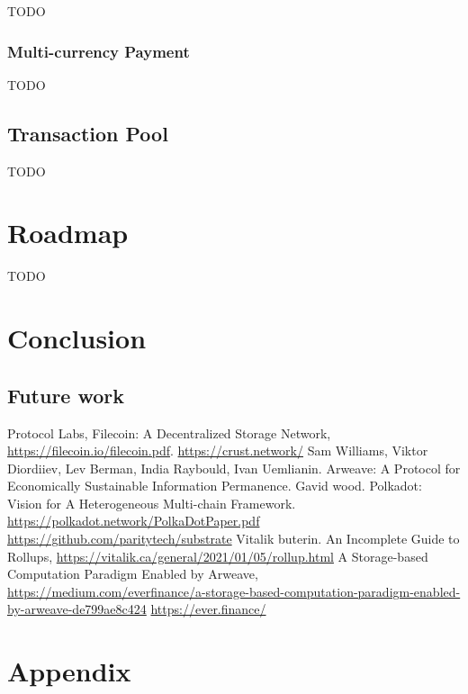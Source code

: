 \documentclass[]{article}
\begin{document}
TODO

\subsubsection{Multi-currency Payment}

TODO

\subsection{Transaction Pool}

TODO

\section{Roadmap}

TODO

\section{Conclusion}

\subsection{Future work}

\begin{thebibliography}{99}
Protocol Labs, Filecoin: A Decentralized Storage Network, \url{https://filecoin.io/filecoin.pdf}.
\url{https://crust.network/}
Sam Williams, Viktor Diordiiev, Lev Berman, India Raybould, Ivan Uemlianin. Arweave: A Protocol for Economically Sustainable Information Permanence.
 Gavid wood. Polkadot: Vision for A Heterogeneous Multi-chain Framework. \url{https://polkadot.network/PolkaDotPaper.pdf}
\url{https://github.com/paritytech/substrate}
Vitalik buterin. An Incomplete Guide to Rollups, \url{https://vitalik.ca/general/2021/01/05/rollup.html}
A Storage-based Computation Paradigm Enabled by Arweave, \url{https://medium.com/everfinance/a-storage-based-computation-paradigm-enabled-by-arweave-de799ae8c424}
\url{https://ever.finance/}
\end{thebibliography}

\appendix
\section{Appendix}
\end{document}
